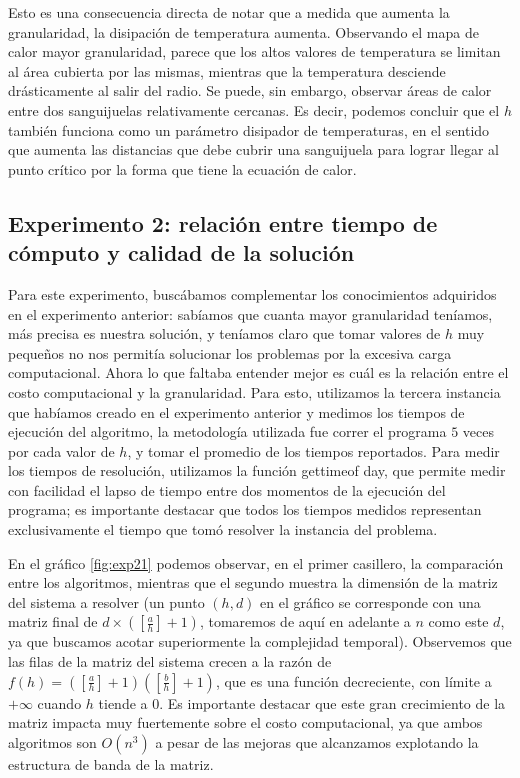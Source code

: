 Esto es una consecuencia directa de notar que a medida que aumenta la granularidad, la disipación de temperatura aumenta. Observando el mapa de calor mayor granularidad, parece que los altos valores de temperatura se limitan al área cubierta por las mismas, mientras que la temperatura desciende drásticamente al salir del radio. Se puede, sin embargo, observar áreas de calor entre dos sanguijuelas relativamente cercanas. Es decir, podemos concluir que el $h$ también funciona como un parámetro disipador de temperaturas, en el sentido que aumenta las distancias que debe cubrir una sanguijuela para lograr llegar al punto crítico por la forma que tiene la ecuación de calor.

\subsection{Experimento 2: relación entre tiempo de cómputo y calidad de la solución}

Para este experimento, buscábamos complementar los conocimientos adquiridos en el experimento anterior: sabíamos que cuanta mayor granularidad teníamos, más precisa es nuestra solución, y teníamos claro que tomar valores de $h$ muy pequeños no nos permitía solucionar los problemas por la excesiva carga computacional. Ahora lo que faltaba entender mejor es cuál es la relación entre el costo computacional y la granularidad. Para esto, utilizamos la tercera instancia que habíamos creado en el experimento anterior y medimos los tiempos de ejecución del algoritmo, la metodología utilizada fue correr el programa $5$ veces por cada valor de $h$, y tomar el promedio de los tiempos reportados. Para medir los tiempos de resolución, utilizamos la función gettimeof day, que permite medir con facilidad el lapso de tiempo entre dos momentos de la ejecución del programa; es importante destacar que todos los tiempos medidos representan exclusivamente el tiempo que tomó resolver la instancia del problema.

En el gráfico \ref{fig:exp21} podemos observar, en el primer casillero, la comparación entre los algoritmos, mientras que el segundo muestra la dimensión de la matriz del sistema a resolver (un punto $(h, d)$ en el gráfico se corresponde con una matriz final de $d \times ([\frac{a}{h}] + 1)$, tomaremos de aquí en adelante a $n$ como este $d$, ya que buscamos acotar superiormente la complejidad temporal). Observemos que las filas de la matriz del sistema crecen a la razón de $f(h) = ([\frac{a}{h}] + 1)([\frac{b}{h}] + 1)$, que es una función decreciente, con límite a $+\infty$ cuando $h$ tiende a $0$. Es importante destacar que este gran crecimiento de la matriz impacta muy fuertemente sobre el costo computacional, ya que ambos algoritmos son $O(n^3)$ a pesar de las mejoras que alcanzamos explotando la estructura de banda de la matriz.

